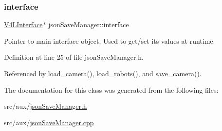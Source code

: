 \mbox{\label{classjson_save_manager_a91983cf64bdd03c74cd6d4576cb521cf}} 
\subsubsection{\texorpdfstring{interface}{interface}}
{\footnotesize\ttfamily \hyperlink{class_v_s_s_s___g_u_i_1_1_v4_l_interface}{V4\+L\+Interface}$\ast$ json\+Save\+Manager\+::interface\hspace{0.3cm}{\ttfamily [private]}}



Pointer to main interface object. Used to get/set it\textquotesingle{}s values at runtime. 



Definition at line 25 of file json\+Save\+Manager.\+h.



Referenced by load\+\_\+camera(), load\+\_\+robots(), and save\+\_\+camera().



The documentation for this class was generated from the following files\+:\begin{DoxyCompactItemize}
\item 
src/aux/\hyperlink{json_save_manager_8h}{json\+Save\+Manager.\+h}\item 
src/aux/\hyperlink{json_save_manager_8cpp}{json\+Save\+Manager.\+cpp}\end{DoxyCompactItemize}
